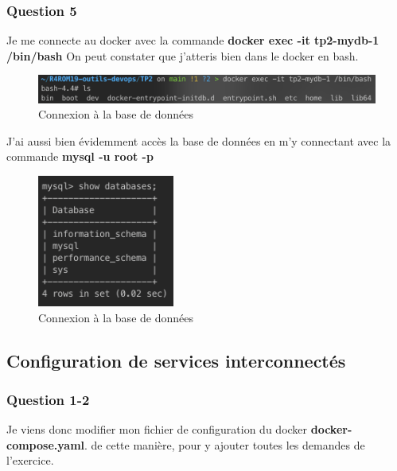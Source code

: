 \documentclass[12pt, a4paper]{article}
\begin{document}
\subsubsection{Question 5}
Je me connecte au docker avec la commande \textbf{docker exec -it tp2-mydb-1 /bin/bash}
On peut constater que j'atteris bien dans le docker en bash.
\begin{figure}[h]
    \centering
    \includegraphics[width=1\textwidth]{img/connexion.png}
    \caption{Connexion à la base de données}
    \label{fig:connexion}
\end{figure}

\newpage
J'ai aussi bien évidemment accès la base de données en m'y connectant avec la commande \textbf{mysql -u root -p}
\begin{figure}[h]
    \centering
    \includegraphics[width=0.4\textwidth]{img/bdd.png}
    \caption{Connexion à la base de données}
    \label{fig:bdd}
\end{figure}

\newpage
\subsection{Configuration de services interconnectés}
\subsubsection{Question 1-2}
Je viens donc modifier mon fichier de configuration du docker \textbf{docker-compose.yaml}.
de cette manière, pour y ajouter toutes les demandes de l'exercice.
\end{document}
